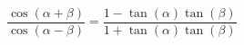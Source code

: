 {$\dfrac{\cos(\alpha + \beta)}{\cos(\alpha - \beta)} = \dfrac{1 - \tan(\alpha)\tan(\beta)}{1 + \tan(\alpha)\tan(\beta)}$}
{}
